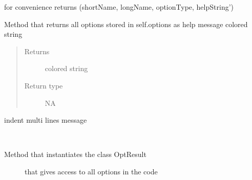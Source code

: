 \documentclass[a4paper,10pt,english]{sphinxmanual}
\begin{document}
\begin{fulllineitems}
\begin{fulllineitems}
\end{fulllineitems}


\begin{fulllineitems}
\label{commands/apidoc/src:src.options.Options.debug_write}
\end{fulllineitems}


\begin{fulllineitems}
\label{commands/apidoc/src:src.options.Options.getDetailOption}
for convenience 
returns (shortName, longName, optionType, helpString')

\end{fulllineitems}


\begin{fulllineitems}
\label{commands/apidoc/src:src.options.Options.get_help}
Method that returns all options stored in self.options 
as help message colored string
\begin{quote}\begin{description}
\item[{Returns}] \leavevmode
colored string

\item[{Return type}] \leavevmode
NA

\end{description}\end{quote}

\end{fulllineitems}


\begin{fulllineitems}
\label{commands/apidoc/src:src.options.Options.indent}
indent multi lines message

\end{fulllineitems}


\begin{fulllineitems}
\label{commands/apidoc/src:src.options.Options.parse_args}~\begin{description}
\item[{Method that instantiates the class OptResult }] \leavevmode
that gives access to all options in the code


\end{description}
\end{fulllineitems}
\end{fulllineitems}
\end{document}
